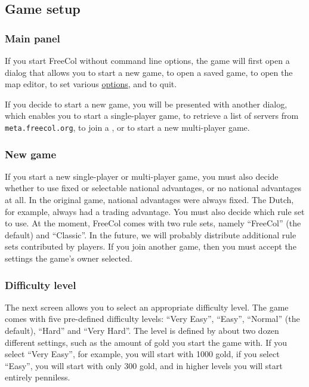 \documentclass[12pt]{book}
\begin{document}
\hypertarget{Game setup}{\subsection{Game setup}}


\hypertarget{Main panel}{\subsubsection{Main panel}}

If you start FreeCol without command line options, the game will first
open a dialog that allows you to start a new game, to open a saved
game, to open the map editor, to set various \hyperlink{client options}
{options}, and to quit.

If you decide to start a new game, you will be presented with another
dialog, which enables you to start a single-player game, to retrieve a
list of servers from \verb$meta.freecol.org$,
to join a , or to start a new multi-player
game.


\hypertarget{New game}{\subsubsection{New game}}

If you start a new single-player or multi-player game, you must also
decide whether to use fixed or selectable national advantages, or no
national advantages at all. In the original game, national advantages
were always fixed. The Dutch, for example, always had a trading
advantage. You must also decide which rule set to use. At the moment,
FreeCol comes with two rule sets, namely ``FreeCol'' (the default) and
``Classic''. In the future, we will probably distribute additional
rule sets contributed by players. If you join another game, then you
must accept the settings the game's owner selected.


\hypertarget{difficulty level}{\subsubsection{Difficulty level}}

The next screen allows you to select an appropriate difficulty
level. The game comes with five pre-defined difficulty levels: ``Very
Easy'', ``Easy'', ``Normal'' (the default), ``Hard'' and ``Very
Hard''. The level is defined by about two dozen different settings,
such as the amount of gold you start the game with. If you select
``Very Easy'', for example, you will start with 1000 gold, if you
select ``Easy'', you will start with only 300 gold, and in higher
levels you will start entirely penniless.
\end{document}
